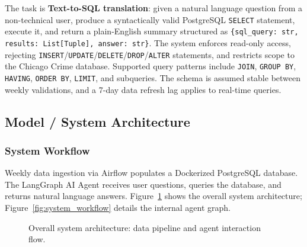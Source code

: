 \documentclass{article}
\begin{document}
The task is \textbf{Text-to-SQL translation}: given a natural language question from a non-technical user, produce a syntactically valid PostgreSQL \texttt{SELECT} statement, execute it, and return a plain-English summary structured as \texttt{\{sql\_query: str, results: List[Tuple], answer: str\}}. The system enforces read-only access, rejecting \texttt{INSERT}/\texttt{UPDATE}/\texttt{DELETE}/\texttt{DROP}/\texttt{ALTER} statements, and restricts scope to the Chicago Crime database. Supported query patterns include \texttt{JOIN}, \texttt{GROUP BY}, \texttt{HAVING}, \texttt{ORDER BY}, \texttt{LIMIT}, and subqueries. The schema is assumed stable between weekly validations, and a 7-day data refresh lag applies to real-time queries.

\subsection{Model / System Architecture}

\subsubsection{System Workflow}

Weekly data ingestion via Airflow populates a Dockerized PostgreSQL database. The LangGraph AI Agent receives user questions, queries the database, and returns natural language answers. Figure~\ref{fig:overall_workflow} shows the overall system architecture; Figure~\ref{fig:system_workflow} details the internal agent graph.

\begin{figure}[H]
\centering
{}
\caption{Overall system architecture: data pipeline and agent interaction flow.}
\label{fig:overall_workflow}
\end{figure}
\end{document}
